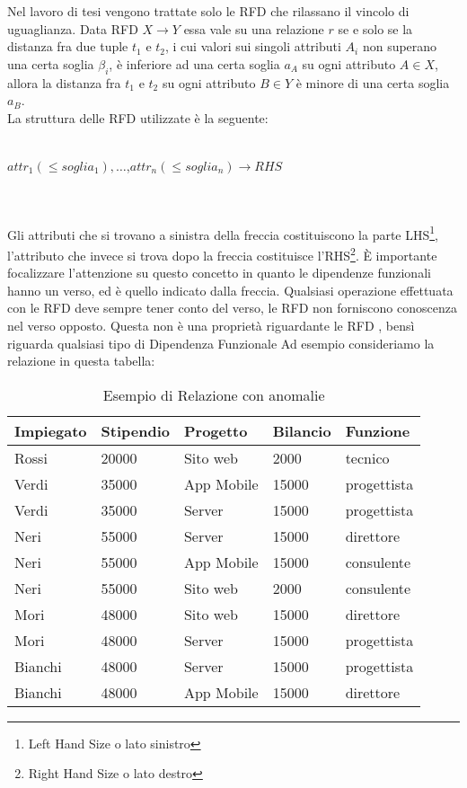 Nel lavoro di tesi vengono trattate solo le RFD che rilassano il vincolo di uguaglianza. Data RFD $X \xrightarrow{} Y$ essa vale su una relazione $r$ se e solo se la distanza fra due tuple $t_1$ e $t_2$, i cui valori sui singoli attributi $A_i$ non superano una certa soglia $\beta_i$, è inferiore ad una certa soglia $a_A$ su ogni attributo $A \in X$, allora la distanza fra $t_1$ e $t_2$ su ogni attributo $B \in Y$ è minore di una certa soglia $a_B$.\\
La struttura delle RFD utilizzate è la seguente:
\\~\\
\centerline{$attr_1(\leq soglia_1),\ldots$,$attr_n(\leq soglia_n) \xrightarrow{} RHS$}
\\~\\
Gli attributi che si trovano a sinistra della freccia costituiscono la parte LHS\footnote{Left Hand Size o lato sinistro}, l'attributo che invece si trova dopo la freccia costituisce l'RHS\footnote{Right Hand Size o lato destro}. 
È importante focalizzare l'attenzione su questo concetto in quanto le dipendenze funzionali hanno un verso, ed è quello indicato dalla freccia. Qualsiasi operazione effettuata con le RFD deve sempre tener conto del verso, le RFD non forniscono conoscenza nel verso opposto. Questa non è una proprietà riguardante le RFD , bensì riguarda qualsiasi tipo di Dipendenza Funzionale
Ad esempio consideriamo la relazione in questa tabella:
\\
\begin{table}[H]
    \centering
    \begin{tabular}{l |l |l |l |l }
     Impiegato & Stipendio & Progetto & Bilancio & Funzione \\
    \hline
    Rossi & 20000  & Sito web & 2000 & tecnico\\
    Verdi & 35000 & App Mobile & 15000 & progettista\\
    Verdi & 35000 & Server & 15000 & progettista\\
    Neri & 55000 & Server & 15000 & direttore\\
    Neri & 55000 & App Mobile & 15000 & consulente\\
    Neri & 55000 & Sito web & 2000 & consulente\\
    Mori & 48000 & Sito web & 15000 & direttore\\
    Mori & 48000 & Server & 15000 & progettista\\
    Bianchi & 48000 & Server & 15000 & progettista\\
    Bianchi & 48000 & App Mobile & 15000 & direttore\\
    \end{tabular}
    \caption{Esempio di Relazione con anomalie}
    \label{tab:relationship_anomalies}
\end{table}

